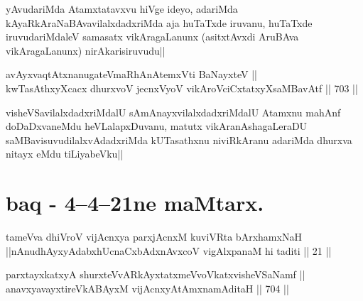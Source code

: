 \begin{artha} 
yAvudariMda Atamxtatavxvu hiVge ideyo, adariMda 
kAyaRkAraNaBAvavilalxdadxriMda aja huTaTxde iruvanu, huTaTxde 
iruvudariMdaleV samasatx vikAragaLanunx (asitxtAvxdi AruBAva 
vikAragaLanunx) nirAkarisiruvudu||
\end{artha}

\begin{shl}
avAyxvaqtAtxnanugateVmaRhAnAtemxVti BaNayxteV || \\
kwTasAthxyXcacx dhurxvoV jecnxVyoV vikAroVciCxtatxyXsaMBavAtf ||  703 ||  
\end{shl}

\begin{artha} 
visheVSavilalxdadxriMdalU sAmAnayxvilalxdadxriMdalU Atamxnu mahAnf 
doDaDxvaneMdu heVLalapxDuvanu, matutx vikAranAshagaLeraDU 
saMBavisuvudilalxvAdadxriMda kUTasathxnu niviRkAranu adariMda dhurxva 
nitayx eMdu tiLiyabeVku||
\end{artha}

\section*{baq - 4--4--21ne maMtarx.}

\begin{shl}
tameVva dhiVroV vijAcnxya parxjAcnxM kuviVRta bArxhamxNaH ||nAnudhAyxyAdabxhUcnaCxbAdxnAvxcoV vigAlxpanaM hi taditi || 21 ||
\end{shl}


\begin{shl}
parxtayxkatxyA shurxteVvARkAyxtatxmeVvoVkatxvisheVSaNamf ||  \\
anavxyavayxtireVkABAyxM vijAcnxyA\s \s tAmxnamAditaH ||  704 ||  
\end{shl}

